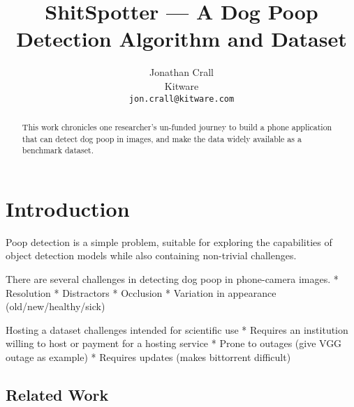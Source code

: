 \documentclass[10pt,twocolumn,letterpaper]{article}
\begin{document}
\title{ShitSpotter --- A Dog Poop Detection Algorithm and Dataset}

\author{Jonathan Crall\\
Kitware\\
{\tt\small jon.crall@kitware.com}
}
\maketitle

\begin{abstract}

    This work chronicles one researcher's un-funded journey to build a phone
    application that can detect dog poop in images, and make the data widely
    available as a benchmark dataset.


\end{abstract}

\section{Introduction}
\label{sec:intro}


Poop detection is a simple problem, suitable for exploring the capabilities of
object detection models while also containing non-trivial challenges.

There are several challenges in detecting dog poop in phone-camera images.
* Resolution
* Distractors
* Occlusion
* Variation in appearance (old/new/healthy/sick)


Hosting a dataset challenges intended for scientific use
* Requires an institution willing to host or payment for a hosting service
* Prone to outages (give VGG outage as example)
* Requires updates (makes bittorrent difficult)


\subsection{Related Work}
\end{document}
